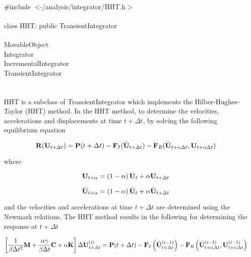 
   \\
\indent \#include $<\tilde{ }$/analysis/integrator/HHT.h$>$  \\

  \\
\indent class HHT: public TransientIntegrator  \\

 \\
\indent MovableObject \\
\indent\indent Integrator \\
\indent\indent\indent IncrementalIntegrator \\
\indent\indent\indent\indent TransientIntegrator \\
\indent\indent\indent\indent{} \\

 \\ 
\indent HHT is a subclass of TransientIntegrator which implements
the Hilber-Hughes-Taylor (HHT) method. In the HHT method, to determine the
velocities, accelerations and displacements at time $t + \Delta t$,
by solving the following equilibrium equation

\[ {\bf R} ({\bf U}_{t + \Delta t}) = {\bf P}(t + \Delta t) -
{\bf F}_I(\ddot{\bf U}_{t+\Delta t}) - {\bf F}_R(\dot{\bf U}_{t + \alpha \Delta t},{\bf U}_{t +
\alpha \Delta t}) \] 

\noindent where

\[ {\bf U}_{t + \alpha} = \left( 1 - \alpha \right) {\bf U}_t + \alpha {\bf U}_{t +
\Delta t} \]

\[ \dot{\bf U}_{t + \alpha} = \left( 1 - \alpha \right) \dot{\bf U}_t + \alpha \dot{\bf U}_{t +
\Delta t} \]

\noindent and the velocities and accelerations at time $t + \Delta t$
are determined using the Newmark relations. The HHT method results in
the following for determining the response at $t + \Delta t$

\[ \left[ \frac{1}{\beta \Delta t^2} {\bf M} + \frac{\alpha \gamma}{\beta
\Delta t} {\bf C} + \alpha {\bf K} \right] \Delta {\bf U}_{t + \Delta t}^{(i)} = {\bf P}(t
+ \Delta t) - {\bf F}_I\left(\ddot{\bf U}_{t+\Delta  t}^{(i-1)}\right)
- {\bf F}_R\left(\dot{\bf U}_{t + \alpha \Delta t}^{(i-1)},{\bf U}_{t + \alpha \Delta
t}^{(i-1)}\right) \] 
\\

